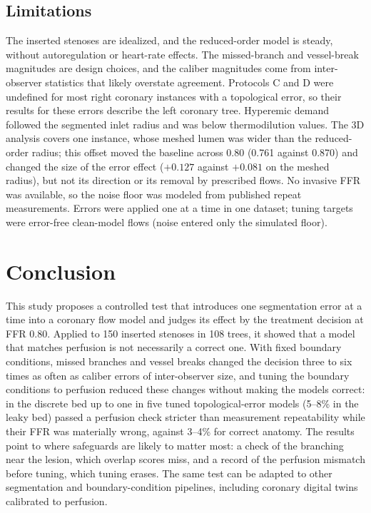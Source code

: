\documentclass[journal,twoside,web]{ieeecolor}
\begin{document}
\subsection{Limitations}
The inserted stenoses are idealized, and the reduced-order model is steady, without autoregulation or heart-rate
effects. The missed-branch and vessel-break magnitudes are design choices, and the caliber magnitudes come from
inter-observer statistics that likely overstate agreement. Protocols C and D were undefined for most right coronary
instances with a topological error, so their results for these errors describe the left coronary tree. Hyperemic
demand followed the segmented inlet radius and was below thermodilution values. The 3D analysis covers one instance, whose
meshed lumen was wider than the reduced-order radius; this offset moved the baseline
across 0.80 (0.761 against 0.870) and changed the size of the error effect ($+0.127$ against $+0.081$ on the meshed radius), but not its
direction or its removal by prescribed flows. No invasive FFR was available, so the noise floor was modeled from published repeat
measurements. Errors were applied one at a time in one dataset; tuning targets were error-free clean-model flows
(noise entered only the simulated floor).

\section{Conclusion}
This study proposes a controlled test that introduces one segmentation error at a time into a coronary flow model and judges
its effect by the treatment decision at FFR 0.80. Applied to 150 inserted stenoses in 108 trees, it showed that a model that matches
perfusion is not necessarily a correct one. With fixed boundary conditions, missed branches and vessel breaks changed the decision three to six times
as often as caliber errors of inter-observer size, and tuning the boundary conditions to perfusion reduced these
changes without making the models correct: in the discrete bed up to one in five tuned topological-error models (5--8\% in the leaky bed) passed a perfusion check stricter than
measurement repeatability while their FFR was materially wrong, against 3--4\% for correct anatomy. The results
point to where safeguards are likely to matter most: a check of the branching near the lesion, which overlap scores miss, and
a record of the perfusion mismatch before tuning, which tuning erases. The same test can be adapted to other
segmentation and boundary-condition pipelines, including coronary digital twins calibrated to perfusion.
\end{document}
